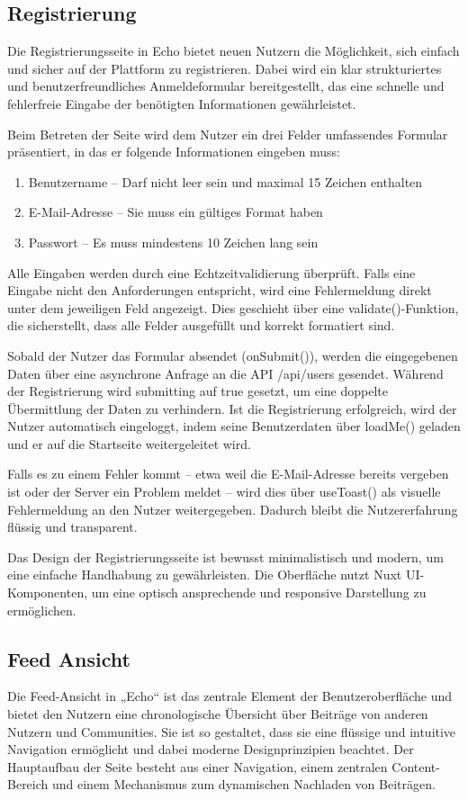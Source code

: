 \documentclass[a4paper,12pt]{article}
\begin{document}
\subsection{Registrierung}
Die Registrierungsseite in Echo bietet neuen Nutzern die Möglichkeit, sich
einfach und sicher auf der Plattform zu registrieren. Dabei wird ein klar
strukturiertes und benutzerfreundliches Anmeldeformular bereitgestellt, das
eine schnelle und fehlerfreie Eingabe der benötigten Informationen
gewährleistet.

Beim Betreten der Seite wird dem Nutzer ein drei Felder umfassendes Formular
präsentiert, in das er folgende Informationen eingeben muss:

\begin{enumerate}
    \item Benutzername – Darf nicht leer sein und maximal 15 Zeichen enthalten
    \item E-Mail-Adresse – Sie muss ein gültiges Format haben
    \item Passwort – Es muss mindestens 10 Zeichen lang sein
\end{enumerate}

Alle Eingaben werden durch eine Echtzeitvalidierung überprüft. Falls eine Eingabe
nicht den Anforderungen entspricht, wird eine Fehlermeldung direkt unter dem
jeweiligen Feld angezeigt. Dies geschieht über eine validate()-Funktion, die
sicherstellt, dass alle Felder ausgefüllt und korrekt formatiert sind.

Sobald der Nutzer das Formular absendet (onSubmit()), werden die eingegebenen
Daten über eine asynchrone Anfrage an die API /api/users gesendet. Während der
Registrierung wird submitting auf true gesetzt, um eine doppelte Übermittlung
der Daten zu verhindern. Ist die Registrierung erfolgreich, wird der Nutzer
automatisch eingeloggt, indem seine Benutzerdaten über loadMe() geladen und er
auf die Startseite weitergeleitet wird.

Falls es zu einem Fehler kommt – etwa weil die E-Mail-Adresse bereits vergeben
ist oder der Server ein Problem meldet – wird dies über useToast() als visuelle
Fehlermeldung an den Nutzer weitergegeben. Dadurch bleibt die Nutzererfahrung
flüssig und transparent.

Das Design der Registrierungsseite ist bewusst minimalistisch und modern, um
eine einfache Handhabung zu gewährleisten. Die Oberfläche nutzt Nuxt
UI-Komponenten, um eine optisch ansprechende und responsive Darstellung zu
ermöglichen.

\subsection{Feed Ansicht}
Die Feed-Ansicht in „Echo“ ist das zentrale Element der Benutzeroberfläche und
bietet den Nutzern eine chronologische Übersicht über Beiträge von anderen
Nutzern und Communities. Sie ist so gestaltet, dass sie eine flüssige und
intuitive Navigation ermöglicht und dabei moderne Designprinzipien beachtet.
Der Hauptaufbau der Seite besteht aus einer Navigation, einem zentralen
Content-Bereich und einem Mechanismus zum dynamischen Nachladen von Beiträgen.
\end{document}
